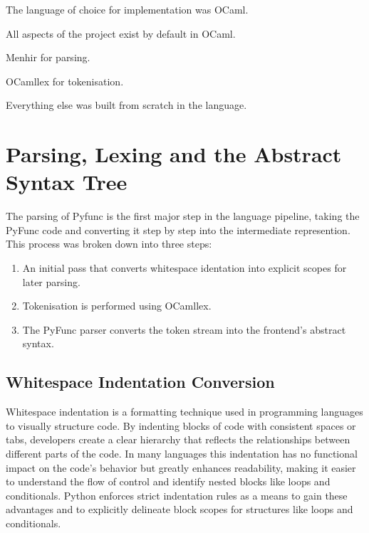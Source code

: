 \documentclass{l4proj}
\begin{document}
The language of choice for implementation was OCaml.

All aspects of the project exist by default in OCaml.

Menhir for parsing.

OCamllex for tokenisation.

Everything else was built from scratch in the language.

\section{Parsing, Lexing and the Abstract Syntax Tree}


The parsing of Pyfunc is the first major step in the language pipeline, taking the PyFunc code and converting it step by step into the intermediate represention.
This process was broken down into three steps:
\begin{enumerate}
    \item An initial pass that converts whitespace identation into explicit scopes for later parsing.
    \item Tokenisation is performed using OCamllex.
    \item The PyFunc parser converts the token stream into the frontend's abstract syntax.
\end{enumerate}

\subsection{Whitespace Indentation Conversion}

Whitespace indentation is a formatting technique used in programming languages to visually structure code.
By indenting blocks of code with consistent spaces or tabs, developers create a clear hierarchy that reflects the relationships between different parts of the code.
In many languages this indentation has no functional impact on the code's behavior but greatly enhances readability, making it easier to understand the flow of control and identify nested blocks like loops and conditionals.
Python enforces strict indentation rules as a means to gain these advantages and to explicitly delineate block scopes for structures like loops and conditionals.
\end{document}
